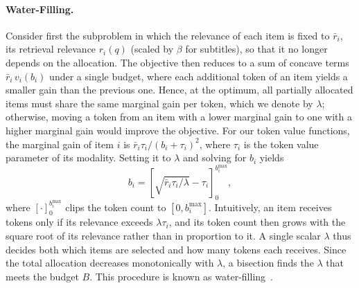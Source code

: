 \paragraph{Water-Filling.}
Consider first the subproblem in which the relevance of each item is fixed to $\bar r_i$, its retrieval relevance $r_i(q)$ (scaled by $\beta$ for subtitles), so that it no longer depends on the allocation. The objective then reduces to a sum of concave terms $\bar r_i\,v_i(b_i)$ under a single budget, where each additional token of an item yields a smaller gain than the previous one. Hence, at the optimum, all partially allocated items must share the same marginal gain per token, which we denote by $\lambda$; otherwise, moving a token from an item with a lower marginal gain to one with a higher marginal gain would improve the objective. For our token value functions, the marginal gain of item $i$ is $\bar r_i\tau_i/(b_i+\tau_i)^2$, where $\tau_i$ is the token value parameter of its modality. Setting it to $\lambda$ and solving for $b_i$ yields
\begin{equation}
b_i=\left[\sqrt{\bar r_i\tau_i/\lambda}-\tau_i\right]_0^{b_i^{\max}},
\label{eq:waterfill}
\end{equation}
where $[\cdot]_0^{b_i^{\max}}$ clips the token count to $[0,b_i^{\max}]$. Intuitively, an item receives tokens only if its relevance exceeds $\lambda\tau_i$, and its token count then grows with the square root of its relevance rather than in proportion to it. A single scalar $\lambda$ thus decides both which items are selected and how many tokens each receives. Since the total allocation decreases monotonically with $\lambda$, a bisection finds the $\lambda$ that meets the budget $B$. This procedure is known as water-filling~\cite{boyd2004,yu2004iwf}.

